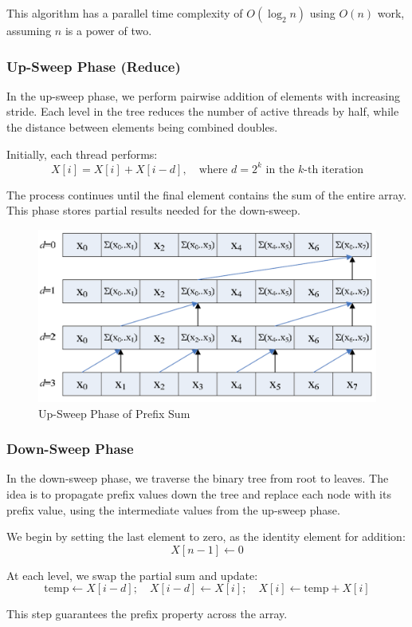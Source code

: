 \documentclass[12pt]{book}
\begin{document}
This algorithm has a parallel time complexity of $O(\log_2 n)$ using $O(n)$ work, assuming $n$ is a power of two.

\subsubsection{Up-Sweep Phase (Reduce)}
In the up-sweep phase, we perform pairwise addition of elements with increasing stride. Each level in the tree reduces the number of active threads by half, while the distance between elements being combined doubles.

Initially, each thread performs:
\[
X[i] = X[i] + X[i - d], \quad \text{where } d = 2^k \text{ in the $k$-th iteration}
\]

The process continues until the final element contains the sum of the entire array. This phase stores partial results needed for the down-sweep.

\begin{figure}[H]
    \centering
    \includegraphics[width=0.6\linewidth]{images/upsweep.png}
    \caption{Up-Sweep Phase of Prefix Sum}
    \label{fig:upsweep}
\end{figure}

\subsubsection{Down-Sweep Phase}
In the down-sweep phase, we traverse the binary tree from root to leaves. The idea is to propagate prefix values down the tree and replace each node with its prefix value, using the intermediate values from the up-sweep phase.

We begin by setting the last element to zero, as the identity element for addition:
\[
X[n - 1] \gets 0
\]

At each level, we swap the partial sum and update:
\[
\text{temp} \gets X[i - d]; \quad X[i - d] \gets X[i]; \quad X[i] \gets \text{temp} + X[i]
\]

This step guarantees the prefix property across the array.
\end{document}
